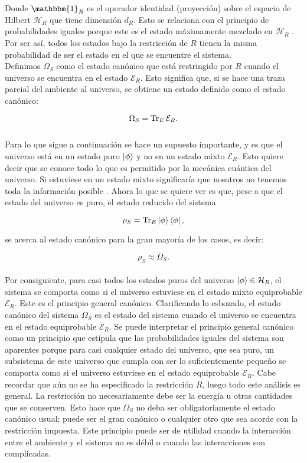 Donde $\mathbbm{1}_{R}$ es el operador identidad (proyección) sobre el espacio de Hilbert  $\mathcal{H}_{R}$  que tiene dimensión $d_{R}$. Esto se relaciona con el principio de probabilidades iguales porque este es el estado máximamente mezclado en $\mathcal{H}_{R}$  \cite{SakuraiQuantum}. Por ser así, todos los estados bajo la restricción de $R$ tienen la misma probabilidad de ser el estado en el que se encuentre el sistema.
\\
Definimos $\Omega_{S}$ como el estado canónico que está restringido por $R$ cuando el universo se encuentra en el estado $\mathcal{E}_{R}$. Esto significa que, si se hace una traza parcial del ambiente al universo, se obtiene un estado definido como el estado canónico:

\begin{equation}
 \Omega_{S} =\Tr_{E} \mathcal{E}_{R}.
\end{equation}
\\
Para lo que sigue a continuación se hace un supuesto importante, y es que el universo está en un estado puro $\ket{\phi}$ y no en un estado mixto $\mathcal{E}_{R}$. Esto quiere decir que se conoce todo lo que es permitido por la mecánica cuántica del universo. Si estuviese en un estado mixto significaría que nosotros no tenemos toda la información posible \cite{SakuraiQuantum}. Ahora lo que se quiere ver es que, pese a que el estado del universo es puro, el estado reducido del sistema

\begin{equation}
\rho_{S}=\Tr_{E}\ket{\phi}\bra{\phi},
\end{equation}

se acerca al estado canónico para la gran mayoría de los casos, es decir:

\begin{equation}
\rho_{S} \approx \Omega_{S}.
\end{equation}
\\
Por consiguiente, para casi todos los estados puros del universo $\ket{\phi} \in \mathcal{H}_{R}$, el sistema se comporta como si el universo estuviese en el estado mixto equiprobable $\mathcal{E}_{R}$. Este es el principio general canónico. Clarificando lo esbozado, el estado canónico del sistema $\Omega_{S}$ es el estado del sistema cuando el universo se encuentra en el estado equiprobable $\mathcal{E}_{R}$. Se puede interpretar el principio general canónico como un principio que estipula que las probabilidades iguales del sistema son aparentes porque para casi cualquier estado del universo, que sea puro, un subsistema de este universo que cumpla con ser lo suficientemente pequeño se comporta como si el universo estuviese en el estado equiprobable $\mathcal{E}_{R}$. Cabe recordar que aún no se ha especificado la restricción $R$, luego todo este análisis es general. La restricción no necesariamente debe ser la energía u otras cantidades que se conserven. Esto hace que $\Omega_{S}$ no  deba ser obligatoriamente el estado canónico usual; puede ser el gran canónico o cualquier otro que sea acorde con la restricción impuesta\cite{ReichlStat}. Este principio puede ser de utilidad cuando la interacción entre el ambiente y el sistema no es débil o cuando las interacciones son complicadas.

